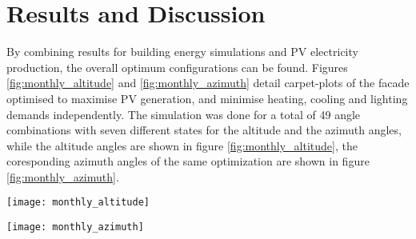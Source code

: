 \chapter{Results and Discussion}
\label{ch:results}



By combining results for building energy simulations and PV electricity production, the overall optimum configurations can be found. Figures \ref{fig:monthly_altitude} and \ref{fig:monthly_azimuth} detail carpet-plots of the facade optimised to maximise PV generation, and minimise heating, cooling and lighting demands independently. The simulation was done for a total of 49 angle combinations with seven different states for the altitude and the azimuth angles, while the altitude angles are shown in figure \ref{fig:monthly_altitude}, the coresponding azimuth angles of the same optimization are shown in figure \ref{fig:monthly_azimuth}.

\begin{figure*}
	\begin{center}
	\texttt{[image: monthly\_altitude]}
	\caption{Carpet plots detailing the optimal altitude configuration to minimise the (a) heating demand, (b) cooling demand, (c) lighting demand, and (d) maximise irradiance on PV panels. Each configuration is represented by an angle of orientation around the x-axis (Altitude) and y-axis (Azimuth) as seen in the legend. Figure (e) details the combinations for optimum building thermal management without PV production. (f) also includes the PV production}
	\label{fig:monthly_altitude}
	\end{center}
\end{figure*}

\begin{figure*}
	\begin{center}
	\texttt{[image: monthly\_azimuth]}
	\caption{Carpet plots detailing the optimal azimuth configuration to minimise the (a) heating demand, (b) cooling demand, (c) lighting demand, and (d) maximise irradiance on PV panels. Each configuration is represented by an angle of orientation around the x-axis (Altitude) and y-axis (Azimuth) as seen in the legend. Figure (e) details the combinations for optimum building thermal management without PV production. (f) also includes the PV production}
	\label{fig:monthly_azimuth}
	\end{center}
\end{figure*}

